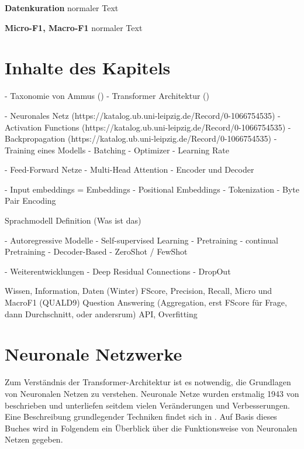 \begin{definition}
    \textbf{Datenkuration} normaler Text
\end{definition}

\begin{definition}
    \textbf{Micro-F1, Macro-F1} normaler Text
\end{definition}

















\section*{Inhalte des Kapitels}
- Taxonomie von Ammus (\citet{ammus}) %
- Transformer Architektur (\citet{attention}) %

- Neuronales Netz (https://katalog.ub.uni-leipzig.de/Record/0-1066754535) %
- Activation Functions (https://katalog.ub.uni-leipzig.de/Record/0-1066754535) %
- Backpropagation (https://katalog.ub.uni-leipzig.de/Record/0-1066754535)%
- Training eines Modells %
    - Batching %
    - Optimizer %
    - Learning Rate %

- Feed-Forward Netze
- Multi-Head Attention
- Encoder und Decoder

- Input embeddings = Embeddings
- Positional Embeddings
- Tokenization %
    - Byte Pair Encoding %


Sprachmodell Definition (Was ist das)

- Autoregressive Modelle %
    - Self-supervised Learning %
    - Pretraining
    - continual Pretraining
    - Decoder-Based %
    - ZeroShot / FewShot

- Weiterentwicklungen
    - Deep Residual Connections %
    - DropOut   %

Wissen, Information, Daten (Winter)
FScore, Precision, Recall, Micro und MacroF1 (QUALD9)
Question Answering (Aggregation, erst FScore für Frage, dann Durchschnitt, oder andersrum)
API, Overfitting

\section{Neuronale Netzwerke}
Zum Verständnis der Transformer-Architektur ist es notwendig, die Grundlagen von Neuronalen Netzen zu verstehen.
Neuronale Netze wurden erstmalig 1943 von \citet{neuronal_networks_first} beschrieben und unterliefen seitdem vielen Veränderungen und Verbesserungen.
Eine Beschreibung grundlegender Techniken findet sich in \citet{neuronale-netze}. Auf Basis dieses Buches wird in Folgendem ein Überblick über die Funktionsweise von Neuronalen Netzen gegeben.\\

